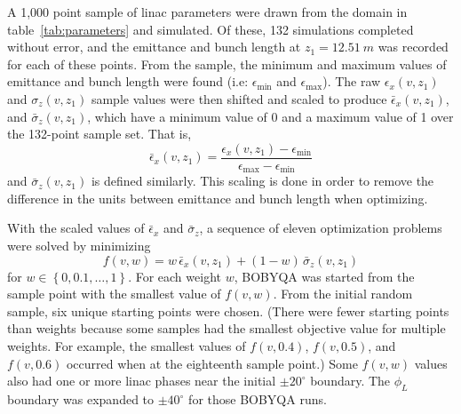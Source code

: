 \documentclass{iitthesis}
\begin{document}
A 1,000 point sample of linac parameters were drawn from the domain
in table~\ref{tab:parameters} and simulated. Of these, 132 simulations completed
without error, and the emittance and bunch length at $z_1=\SI{12.51}{m}$ was
recorded for each of these points. From the sample, the minimum and maximum values of emittance and bunch length
were found (i.e: $\epsilon_{\min}$ and $\epsilon_{\max}$). 
The raw $\epsilon_x(v,z_1)$ and $\sigma_z(v,z_1)$ sample values were then
shifted and scaled to produce $\bar{\epsilon}_x(v,z_1)$, and $\bar{\sigma}_z(v,z_1)$,
which have a minimum value of 0 and a maximum value of 1 over the 132-point sample set. That is, 
\begin{equation}
\bar{\epsilon}_x (v,z_1) = \frac{ \epsilon_x (v,z_1) - \epsilon_{\min} } { \epsilon_{\max} - \epsilon_{\min} }
\label{eq:scale}
\end{equation} 
and $\bar{\sigma}_z (v,z_1)$ is defined similarly.
This scaling is done in order to remove the difference in the units between
emittance and bunch length when optimizing.

With the scaled values of $\bar{\epsilon}_x$ and $\bar{\sigma}_z$, a sequence
of eleven optimization problems were solved by minimizing 
\begin{equation}
f(v,w) = w \,\bar{\epsilon}_x(v,z_1) + (1-w)\, \bar{\sigma}_z(v,z_1)
\label{eq:newobj}
\end{equation}
for $w \in \left\{ 0, 0.1, \ldots, 1 \right\}$. 
For each weight $w$, BOBYQA was started from the sample point with the 
smallest value of $f(v,w)$.  From the initial random sample, six unique starting points were chosen. 
(There were fewer starting points than weights because some samples had the smallest objective value for multiple weights. 
For example, the smallest values of $f(v,0.4)$, $f(v,0.5)$, and $f(v,0.6)$ occurred when at the eighteenth sample point.)
Some $f(v,w)$ values also had one or more linac phases near the initial $\pm20^{\circ}$ boundary. 
The $\phi_L$ boundary was expanded to $\pm40^{\circ}$ for those BOBYQA runs.
\end{document}
